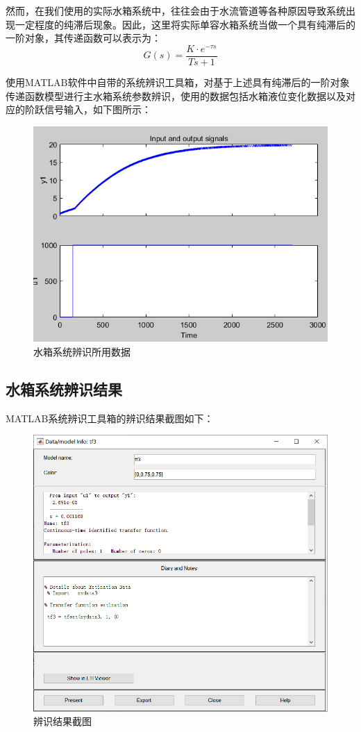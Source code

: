 \documentclass[UTF8]{article}
\begin{document}
然而，在我们使用的实际水箱系统中，往往会由于水流管道等各种原因导致系统出现一定程度的纯滞后现象。因此，这里将实际单容水箱系统当做一个具有纯滞后的一阶对象，其传递函数可以表示为：
\begin{equation*}
	G(s) = \frac{K\cdot e^{-\tau s}}{Ts + 1}
\end{equation*}

使用MATLAB软件中自带的系统辨识工具箱，对基于上述具有纯滞后的一阶对象传递函数模型进行主水箱系统参数辨识，使用的数据包括水箱液位变化数据以及对应的阶跃信号输入，如下图所示：
\begin{figure}[H]
    \centering %
    \includegraphics[width=.6\textwidth]{figure/水箱辨识-辨识所用数据.png} 
    \caption{水箱系统辨识所用数据} %
\end{figure}

\subsection{水箱系统辨识结果}
MATLAB系统辨识工具箱的辨识结果截图如下：
\begin{figure}[H]
    \centering %
    \includegraphics[width=.6\textwidth]{figure/水箱辨识-传递函数.png} 
    \caption{辨识结果截图} %
\end{figure}
\end{document}

